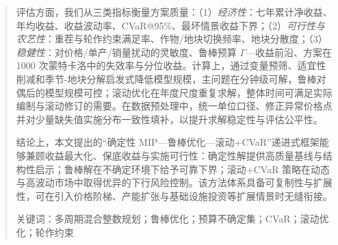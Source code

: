 \begin{abstract}
评估方面，我们从三类指标衡量方案质量：（1）\emph{经济性}：七年累计净收益、年均收益、收益波动率、CVaR@95\%、最坏情景收益下界；（2）\emph{可行性与农艺性}：重茬与轮作约束满足率、作物/地块切换频率、地块分散度；（3）\emph{稳健性}：对价格/单产/销量扰动的灵敏度、鲁棒预算 \(\Gamma\)—收益前沿、方案在 1000 次蒙特卡洛中的失效率与分位收益。计算上，通过变量预筛、适宜性削减和季节-地块分解启发式降低模型规模，主问题在分钟级可解，鲁棒对偶后的模型规模可控；滚动优化在年度尺度重复求解，整体时间可满足实际编制与滚动修订的需要。在数据预处理中，统一单位口径、修正异常价格点并对少量缺失值实施分布一致性填补，以提升求解稳定性与评估公平性。
    
结论上，本文提出的“确定性 MIP\cite{ji2021mip}—鲁棒优化—滚动+CVaR\cite{alexander2006minimizing}”递进式框架能够兼顾收益最大化、保底收益与实施可行性：确定性解提供高质量基线与结构性启示；鲁棒解在不确定环境下给予可靠下界；滚动+CVaR 策略在动态与高波动市场中取得优异的下行风险控制。该方法体系具备可复制性与扩展性，可在引入价格阶梯、产能扩张与基础设施投资等扩展情景时无缝衔接。

\vspace{0.5\baselineskip}
\noindent 关键词：多周期混合整数规划；鲁棒优化；预算不确定集；CVaR；滚动优化；轮作约束
    \endgroup

\end{abstract}

